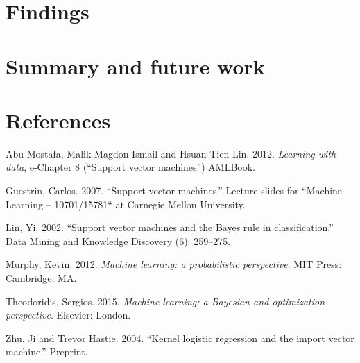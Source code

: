 \documentclass[letterpaper, 12pt]{article}
\begin{document}
\section{Findings}

\section{Summary and future work}

\section{References}

Abu-Mostafa, Malik Magdon-Ismail and Hsuan-Tien Lin. 2012. \emph{Learning with data}, e-Chapter 8 (``Support vector machines'') AMLBook.

Guestrin, Carlos. 2007. ``Support vector machines.'' Lecture slides for ``Machine Learning – 10701/15781`` at Carnegie Mellon University. 

Lin, Yi. 2002. ``Support vector machines and the Bayes rule in classification.'' Data Mining and Knowledge Discovery (6): 259–275.

Murphy, Kevin. 2012. \emph{Machine learning: a probabilistic perspective}. MIT Press: Cambridge, MA.

Theodoridis, Sergios. 2015. \emph{Machine learning: a Bayesian and optimization perspective}. Elsevier: London.

Zhu, Ji and Trevor Hastie. 2004. ``Kernel logistic regression and the import vector machine.'' Preprint.
\end{document}
